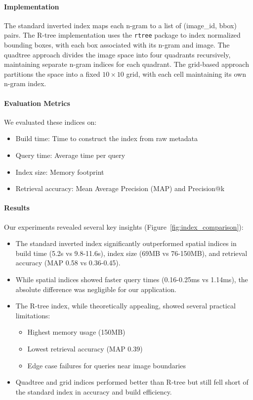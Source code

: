 \documentclass[manuscript,screen]{acmart}
\begin{document}
\paragraph{Implementation} The standard inverted index maps each n-gram to a list of (image\_id, bbox) pairs. The R-tree implementation uses the \verb|rtree| package to index normalized bounding boxes, with each box associated with its n-gram and image. The quadtree approach divides the image space into four quadrants recursively, maintaining separate n-gram indices for each quadrant. The grid-based approach partitions the space into a fixed $10\times10$ grid, with each cell maintaining its own n-gram index.

\paragraph{Evaluation Metrics} We evaluated these indices on:
\begin{itemize}
    \item Build time: Time to construct the index from raw metadata
    \item Query time: Average time per query
    \item Index size: Memory footprint
    \item Retrieval accuracy: Mean Average Precision (MAP) and Precision@k
\end{itemize}

\paragraph{Results} Our experiments revealed several key insights (Figure~\ref{fig:index_comparison}):

\begin{itemize}
    \item The standard inverted index significantly outperformed spatial indices in build time (5.2s vs 9.8-11.6s), index size (69MB vs 76-150MB), and retrieval accuracy (MAP 0.58 vs 0.36-0.45).
    \item While spatial indices showed faster query times (0.16-0.25ms vs 1.14ms), the absolute difference was negligible for our application.
    \item The R-tree index, while theoretically appealing, showed several practical limitations:
          \begin{itemize}
              \item Highest memory usage (150MB)
              \item Lowest retrieval accuracy (MAP 0.39)
              \item Edge case failures for queries near image boundaries
          \end{itemize}
    \item Quadtree and grid indices performed better than R-tree but still fell short of the standard index in accuracy and build efficiency.
\end{itemize}
\end{document}
